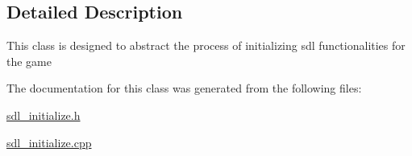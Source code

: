 \subsection{Detailed Description}
This class is designed to abstract the process of initializing sdl functionalities for the game 

The documentation for this class was generated from the following files\+:\begin{DoxyCompactItemize}
\item 
\hyperlink{sdl__initialize_8h}{sdl\+\_\+initialize.\+h}\item 
\hyperlink{sdl__initialize_8cpp}{sdl\+\_\+initialize.\+cpp}\end{DoxyCompactItemize}
